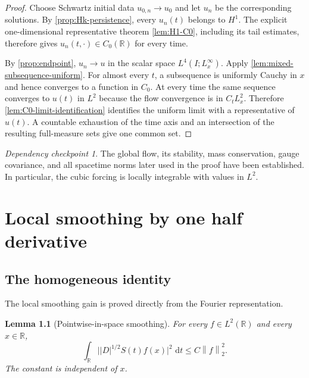 \documentclass[11pt,oneside]{book}
\newtheorem{lemma}[theorem]{Lemma}
\theoremstyle{definition}
\theoremstyle{remark}
\newtheorem{checkpoint}[theorem]{Dependency checkpoint}
\newcommand{\R}{\mathbb R}
\newcommand{\1}{\mathbf 1}
\newcommand{\dd}{\,\mathrm d}
\newcommand{\norm}[1]{\left\lVert #1\right\rVert}
\begin{document}
\begin{proof}
Choose Schwartz initial data $u_{0,n}\to u_0$ and let $u_n$ be the
corresponding solutions.  By \cref{prop:Hk-persistence}, every
$u_n(t)$ belongs to $H^1$.  The explicit one-dimensional representative
theorem \cref{lem:H1-C0}, including its tail estimates, therefore gives
$u_n(t,\cdot)\in C_0(\R)$ for every time.

By \cref{prop:endpoint}, $u_n\to u$ in the scalar space
$L^4(I;L^\infty_x)$.  Apply \cref{lem:mixed-subsequence-uniform}.  For almost
every $t$, a subsequence is uniformly Cauchy in $x$ and hence converges to a
function in $C_0$.  At every time the same sequence converges to $u(t)$ in
$L^2$ because the flow convergence is in $C_tL^2_x$.  Therefore
\cref{lem:C0-limit-identification} identifies the uniform limit with a
representative of $u(t)$.  A countable exhaustion of the time axis and an
intersection of the resulting full-measure sets give one common set.
\end{proof}

\begin{checkpoint}
The global flow, its stability, mass conservation, gauge covariance, and all
spacetime norms later used in the proof have been established.  In
particular, the cubic forcing is locally integrable with values in $L^2$.
\end{checkpoint}

\chapter{Local smoothing by one half derivative}\label{chap:smoothing}

\section{The homogeneous identity}
The local smoothing gain is proved directly from the Fourier representation.

\begin{lemma}[Pointwise-in-space smoothing]\label{lem:point-smoothing}
For every $f\in L^2(\R)$ and every $x\in\R$,
\begin{equation}
 \int_\R\big| |D|^{1/2}S(t)f(x)\big|^2\,\dd t
 \le C\norm f_2^2.                                 \label{eq:point-smoothing}
\end{equation}
The constant is independent of $x$.
\end{lemma}
\end{document}
